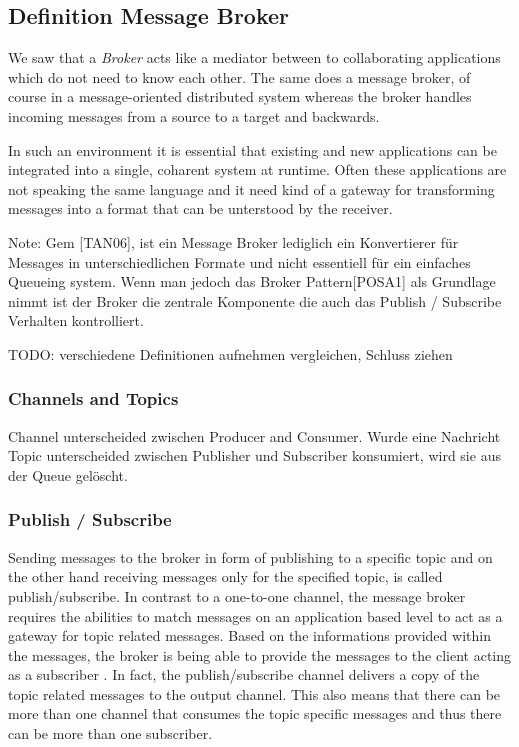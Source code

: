\subsection{Definition Message Broker}
We saw that a \textit{Broker} acts like a mediator between to collaborating
applications which do not need to know each other. The same does a message
broker, of course in a message-oriented distributed system whereas the broker
handles incoming messages from a source to a target and backwards. 

In such an environment it is essential that existing and new applications can be
integrated into a single, coharent system at runtime. Often these applications
are not speaking the same language and it need kind of a gateway for
transforming messages into a format that can be unterstood by the receiver.
\cite{TAN06}

Note: Gem [TAN06], ist ein Message Broker lediglich ein Konvertierer für
Messages in unterschiedlichen Formate und nicht essentiell für ein einfaches
Queueing system. Wenn man jedoch das Broker Pattern[POSA1] als Grundlage nimmt
ist der Broker die zentrale Komponente die auch das Publish / Subscribe
Verhalten kontrolliert. 

TODO: verschiedene Definitionen aufnehmen vergleichen, Schluss ziehen \\

\subsubsection{Channels and Topics} %
Channel unterscheided zwischen Producer and Consumer. Wurde eine Nachricht
Topic unterscheided zwischen Publisher und Subscriber
konsumiert, wird sie aus der Queue gelöscht. 

\subsubsection{Publish / Subscribe}
Sending messages to the broker in form of publishing to a specific topic and
on the other hand receiving messages only for the specified topic, is called
publish/subscribe.
In contrast to a one-to-one channel, the message broker requires the abilities 
to match messages on an application based level to act as a gateway for topic
related messages. Based on the informations provided within the messages, 
the broker is being able to provide the messages to the client acting as a 
subscriber \cite{TAN06}. In fact, the publish/subscribe channel delivers a copy of the 
topic related messages to the output channel. This also means that there can 
be more than one channel that consumes the topic specific messages and thus there
can be more than one subscriber. \cite{EIP03}

